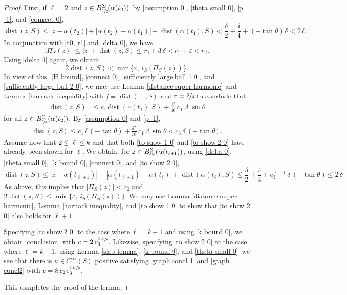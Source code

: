 \documentclass[10pt,a4paper]{amsart}
\begin{document}
\begin{proof}
		First, if $\ell=2$ and $z\in B^\Sigma_{\sfrac{\delta}{2}}(\alpha(t_2))$, by  \eqref{assumption 0},  \eqref{theta small 0}, \eqref{p -1},  and \eqref{connect 0}, 
		$$
		\operatorname{dist}(z,S)\leq |z-\alpha(t_2)|+|\alpha(t_2)-\alpha(t_1)|+\operatorname{dist}(\alpha(t_1),S)<  	\frac{\delta}{2}+\frac{\delta}{4}	
		+(-\tan\theta)\,\delta<2\,\delta.
		$$
		In conjunction with \eqref{r0, r1} and \eqref{delta 0}, we have 
		$$
		|\Pi_S(z)|\leq|z|+\operatorname{dist}(z,S)\leq r_1+3\,\delta<r_1+\varepsilon<r_2.
		$$
		Using \eqref{delta 0} again, we obtain
		$$ 
			2\operatorname{dist}(z,S)< \min\{\varepsilon,\,i_S(\Pi_S(z))\}.
			$$
		In view of this, \eqref{H bound}, \eqref{connect 0}, \eqref{sufficiently large ball 1 0}, and \eqref{sufficiently large ball 2 0}, we may use Lemma \ref{distance super harmonic} and Lemma \ref{harnack inequality} with $f=\operatorname{dist}(\,\cdot\,,S)$ and $r=\sfrac{\delta}{4}$ to conclude that
			\begin{align*} 
			\operatorname{dist}(z,S)&\leq c_1\operatorname{dist}(\alpha(t_1),S)+\frac{\delta^2}{16}\,c_1\,\Lambda\,\sin\theta
			\end{align*} 
		 for all $z\in B^\Sigma_{\sfrac{\delta}{4}}(\alpha(t_2))$.  By \eqref{assumption 0} and \eqref{p -1}, 
		\begin{align*} 
	\operatorname{dist}(z,S)\leq c_1\,\delta\,(-\tan\theta)+\frac{\delta^2}{16}\,c_1\,\Lambda\,\sin\theta
	< c_3\,\delta\,(-\tan\theta).
		\end{align*} 
		Assume now that $2\leq \ell\leq k$ and that both \eqref{to show 1 0} and \eqref{to show 2 0} have already been shown for $\ell$. We obtain, for  $z\in B^\Sigma_{\sfrac{\delta}{2}}(\alpha(t_{\ell+1}))$, using  \eqref{delta 0}, \eqref{theta small 0}, \eqref{k bound 0}, \eqref{connect 0}, and \eqref{to show 2 0},  
		$$
		\operatorname{dist}(z,S)\leq |z-\alpha(t_{\ell+1})|+|\alpha(t_{\ell+1})-\alpha(t_{\ell})|+\operatorname{dist}(\alpha(t_{\ell}),S)\leq \frac\delta2+\frac\delta 4+c_3^{\ell-1}\,\delta\,(-\tan\theta)\leq 2\,\delta 
		$$
		As above, this implies that $|\Pi_S(z)|<r_2$ and $2\operatorname{dist}(z,S)\leq \min\{\varepsilon,\,i_S(\Pi_S(z))\}$.  
		We may use Lemma \ref{distance super harmonic}, Lemma \ref{harnack inequality}, and \eqref{to show 1 0} to show that \eqref{to show 2 0} also holds for $\ell+1$. 
		
		Specifying \eqref{to show 2 0} to the case where $\ell=k+1$ and using \eqref{k bound 0}, we obtain \eqref{conclusion} with $c=2\,c_3^{\sfrac{4\,L}{\delta}}$. Likewise, specifying \eqref{to show 2 0} to the case where $\ell=k+1$, using Lemma \ref{slab lemma}, \eqref{k bound 0}, and \eqref{theta small 0}, we see that there is  $u\in C^\infty(S)$ positive satisfying \eqref{graph concl 1} and \eqref{graph concl2} with $c=8\,c_2\,c_3^{\sfrac{4\,L}{\delta}}$.
		
	
		
		
		This completes the proof of the lemma.
		

	\end{proof}
\end{document}
